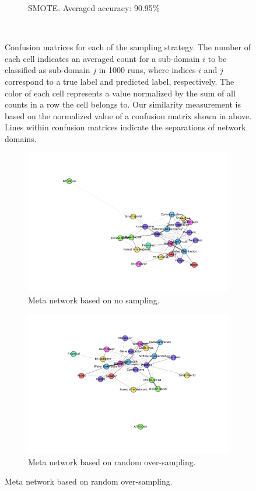 \documentclass{article}
\begin{document}
\begin{figure}[H]
\begin{subfigure}{0.48\textwidth}
	\caption{SMOTE. Averaged accuracy: 90.95\%} \label{smote_confusion_sub}
	\end{subfigure}
\
\caption{Confusion matrices for each of the sampling strategy. The number of each cell indicates an averaged count for a sub-domain $i$ to be classified as sub-domain $j$ in 1000 runs, where indices $i$ and $j$ correspond to a true label and predicted label, respectively. The color of each cell represents a value normalized by the sum of all counts in a row the cell belongs to. Our similarity measurement is based on the normalized value of a confusion matrix shown in above. Lines within confusion matrices indicate the separations of network domains.} \label{confusion_sub}
\end{figure}

\begin{figure}[H]
	\begin{subfigure}{0.48\textwidth}
	\includegraphics[width=\linewidth]{figs/similarity/SubDomain/None/graph.png}
	\caption{Meta network based on no sampling.} \label{no_graph_sub_original}
	\end{subfigure}\hspace*{\fill}
	\begin{subfigure}{0.48\textwidth}
	\includegraphics[width=\linewidth]{figs/similarity/SubDomain/RandomOver/graph.png}
	\caption{Meta network based on random over-sampling.} \label{random_over_graph_sub_original}
	\end{subfigure}
	

\end{figure}
\end{document}

